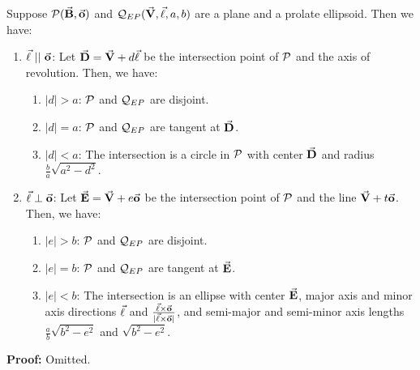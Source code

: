 \begin{lemma}
     Suppose ${\cal P}(\vec{\bf B},\vec{\bf o})$ and
${\cal Q}_{EP}(\vec{\bf V},\vec{\bf \ell},a,b)$ are a plane and a prolate
ellipsoid.  Then we have:
\begin{enumerate}
     \item $\vec{\bf \ell}\ ||\ \vec{\bf o}$:
          Let $\vec{\bf D}=\vec{\bf V}+d\vec{\bf \ell}$ be the intersection
          point of ${\cal P}$ and the axis of revolution.  Then, we have:
     \begin{enumerate}
          \item $|d|>a$: ${\cal P}$ and ${\cal Q}_{EP}$ are disjoint.
          \item $|d|=a$: ${\cal P}$ and ${\cal Q}_{EP}$ are tangent at
               $\vec{\bf D}$.
          \item $|d|<a$: The intersection is a circle in ${\cal P}$ with
               center $\vec{\bf D}$ and radius $\frac{b}{a}\sqrt{a^2-d^2}$.
     \end{enumerate}
     \item $\vec{\bf \ell}\perp\vec{\bf o}$:
          Let $\vec{\bf E}=\vec{\bf V}+e\vec{\bf o}$ be the intersection
          point of ${\cal P}$ and the line $\vec{\bf V}+t\vec{\bf o}$.
          Then, we have:
     \begin{enumerate}
          \item $|e|>b$: ${\cal P}$ and ${\cal Q}_{EP}$ are disjoint.
          \item $|e|=b$: ${\cal P}$ and ${\cal Q}_{EP}$ are tangent at
               $\vec{\bf E}$.
          \item $|e|<b$: The intersection is an ellipse with center
               $\vec{\bf E}$, major axis and minor axis directions $\vec{\bf \ell}$
       and $\frac{\vec{\bf \ell}\times\vec{\bf o}}{|\vec{\bf \ell}\times\vec{\bf o}|}$,
               and semi-major and semi-minor axis lengths
               $\frac{a}{b}\sqrt{b^2-e^2}$ and $\sqrt{b^2-e^2}$.
     \end{enumerate}
\end{enumerate}
\end{lemma}
{\bf Proof:}  Omitted. \QED

